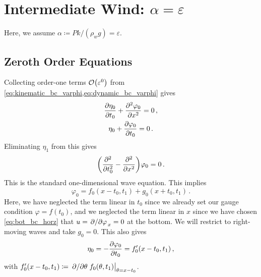 \documentclass{jfm}
\renewcommand*{\epsilon}{\varepsilon}
\begin{document}
\section{\label{sec:intermediate} \texorpdfstring{Intermediate Wind:
$\alpha = \epsilon$}{Intermediate Wind}}
Here, we assume $\alpha \coloneqq P k/(\rho_w g) = \epsilon$.
\subsection{Zeroth Order Equations}
Collecting order-one terms $\order{\epsilon^0}$ from
\cref{eq:kinematic_bc_varphi,eq:dynamic_bc_varphi} gives
\begin{gather}
  \pdv{\eta_0}{t_0} + \pdv[2]{\varphi_0}{x} = 0 \,, \\
  \eta_0 + \pdv{\varphi_0}{t_0} = 0 \,.
\end{gather}
Eliminating $\eta_1$ from this gives
\begin{equation}
  \pqty{\pdv[2]{t_0} - \pdv[2]{x} } \varphi_0 = 0 \,.
  \label{eq:wave_eq}
\end{equation}
This is the standard one-dimensional wave equation.
This implies
\begin{equation}
  \varphi_0 = f_0(x-t_0,t_1) + g_0(x+t_0,t_1) \,.
  \label{eq:phi0_sol}
\end{equation}
Here, we have neglected the term linear in $t_0$ since we already set
our gauge condition $\varphi = f(t_0)$, and we neglected the term linear
in $x$ since we have chosen \cref{eq:bot_bc_horz} that $u =
\pdv*{\varphi}_x = 0$ at the bottom.
We will restrict to right-moving waves and take $g_0 = 0$.
This also gives
\begin{equation}
  \eta_0 = - \pdv{\varphi_0}{t_0} = f_0'(x-t_0,t_1) \,,
  \label{eq:eta0_sol}
\end{equation}
with $f_0'(x-t_0,t_1) \coloneqq \eval{\pdv*{\theta}
f_0(\theta,t_1)}_{\theta = x-t_0}$.
\end{document}
